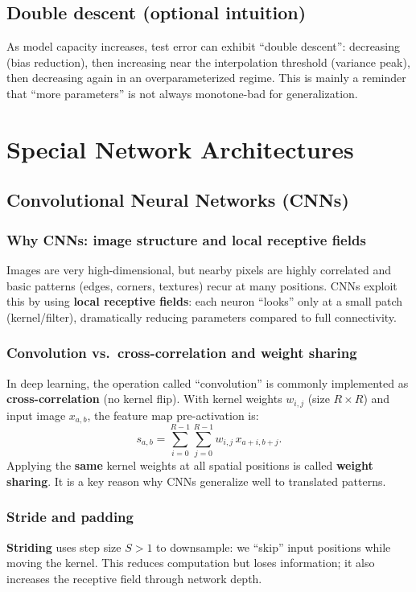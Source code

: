 \documentclass[11pt, oneside]{book}
\newcommand{\1}{\ind}                       %
\begin{document}
\section{Double descent (optional intuition)}
As model capacity increases, test error can exhibit ``double descent'': decreasing (bias reduction), then increasing near the interpolation threshold (variance peak), then decreasing again in an overparameterized regime. This is mainly a reminder that ``more parameters'' is not always monotone-bad for generalization.

\chapter{Special Network Architectures}

\section{Convolutional Neural Networks (CNNs)}
\subsection{Why CNNs: image structure and local receptive fields}
Images are very high-dimensional, but nearby pixels are highly correlated and basic patterns (edges, corners, textures) recur at many positions.
CNNs exploit this by using \textbf{local receptive fields}: each neuron ``looks'' only at a small patch (kernel/filter), dramatically reducing parameters compared to full connectivity.

\subsection{Convolution vs.\ cross-correlation and weight sharing}
In deep learning, the operation called ``convolution'' is commonly implemented as \textbf{cross-correlation} (no kernel flip). With kernel weights $w_{i,j}$ (size $R\times R$) and input image $x_{a,b}$, the feature map pre-activation is:
\[
s_{a,b}=\sum_{i=0}^{R-1}\sum_{j=0}^{R-1} w_{i,j}\,x_{a+i,b+j}.
\]
Applying the \textbf{same} kernel weights at all spatial positions is called \textbf{weight sharing}. It is a key reason why CNNs generalize well to translated patterns.

\subsection{Stride and padding}
\textbf{Striding} uses step size $S>1$ to downsample: we ``skip'' input positions while moving the kernel. This reduces computation but loses information; it also increases the receptive field through network depth.
\end{document}
